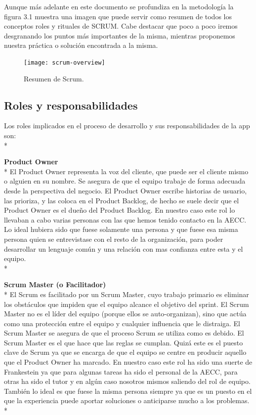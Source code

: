 \documentclass[../pfc.tex]{subfiles}
\begin{document}
	Aunque más adelante en este documento se profundiza en la metodología la figura 3.1 muestra una imagen que puede servir como resumen de todos los conceptos roles y rituales de SCRUM. Cabe destacar que poco a poco iremos desgranando los puntos más importantes de la misma, mientras proponemos nuestra práctica o solución encontrada a la misma.
	
		\begin{figure}[h]
			\centering
			\texttt{[image: scrum-overview]}
			\caption{Resumen de Scrum.}
			\label{fig:Resumen de Scrum}
		\end{figure}
	
	\subsection{Roles y responsabilidades}
	Los roles  implicados en el proceso de desarrollo y sus responsabilidades de la app son:\\*

	\textbf{Product Owner}\\*
	El Product Owner representa la voz del cliente, que puede ser el cliente mismo o alguien en su nombre. Se asegura de que el equipo trabaje de forma adecuada desde la perspectiva del negocio. El Product Owner escribe historias de usuario, las prioriza, y las coloca en el Product Backlog, de hecho se suele decir que el Product Owner es el dueño del Product Backlog. En nuestro caso este rol lo llevaban a cabo varias personas con las que hemos tenido contacto en la AECC. Lo ideal hubiera sido que fuese solamente una persona y que fuese esa misma persona quien se entrevistase con el resto de la organización, para poder desarrollar un lenguaje común y una relación con mas confianza entre esta y el equipo.\\*
	
	\textbf{Scrum Master (o Facilitador)}\\*
	El Scrum es facilitado por un Scrum Master, cuyo trabajo primario es eliminar los obstáculos que impiden que el equipo alcance el objetivo del sprint. El Scrum Master no es el líder del equipo (porque ellos se auto-organizan), sino que actúa como una protección entre el equipo y cualquier influencia que le distraiga. El Scrum Master se asegura de que el proceso Scrum se utiliza como es debido. El Scrum Master es el que hace que las reglas se cumplan. Quizá este es el puesto clave de Scrum ya que se encarga de que el equipo se centre en producir aquello que el Product Owner ha marcado. En nuestro caso este rol ha sido una suerte de Frankestein ya que para algunas tareas ha sido el personal de la AECC, para otras ha sido el tutor y en algún caso nosotros mismos saliendo del rol de equipo. También lo ideal es que fuese la misma persona siempre ya que es un puesto en el que la experiencia puede aportar soluciones o anticiparse mucho a los problemas.\\*
	
\end{document}
